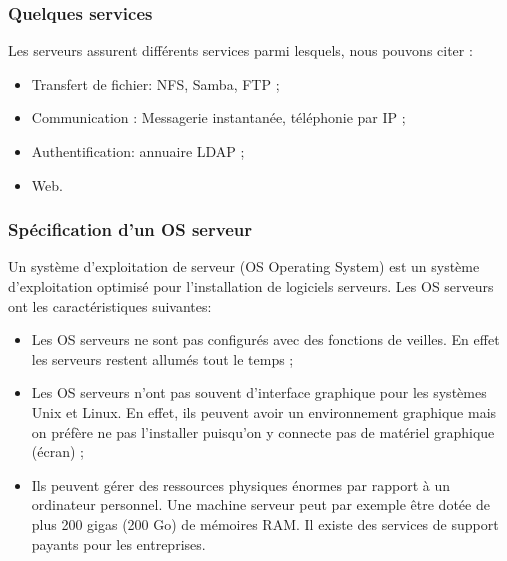 \documentclass[a4paper,12pt,french]{report} %
\begin{document}
\subsubsection{Quelques services}
Les serveurs assurent différents services parmi lesquels, nous pouvons citer :
\begin{itemize}
\item Transfert de fichier: NFS, Samba, FTP ;
\item Communication : Messagerie instantanée, téléphonie par IP ;
\item Authentification: annuaire LDAP ;
\item Web.
\end{itemize}

\subsubsection{Spécification d'un OS serveur}
	Un système d'exploitation de serveur (OS Operating System) est un système d'exploitation optimisé pour l'installation de logiciels serveurs. Les OS serveurs ont les caractéristiques suivantes:
\begin{itemize}
	\item Les OS serveurs ne sont pas configurés avec des fonctions de veilles. En effet les serveurs restent allumés tout le temps ;
	\item Les OS serveurs n'ont pas souvent d'interface graphique pour les systèmes Unix et Linux. En effet, ils peuvent avoir un environnement graphique mais on préfère ne pas l'installer puisqu'on y connecte pas de matériel graphique (écran) ;
	\item Ils peuvent gérer des ressources physiques énormes par rapport à un ordinateur personnel. Une machine serveur peut par exemple être dotée de plus 200 gigas (200 Go) de mémoires RAM. Il existe des services de support payants pour les entreprises.
\end{itemize} 
	
\end{document}
